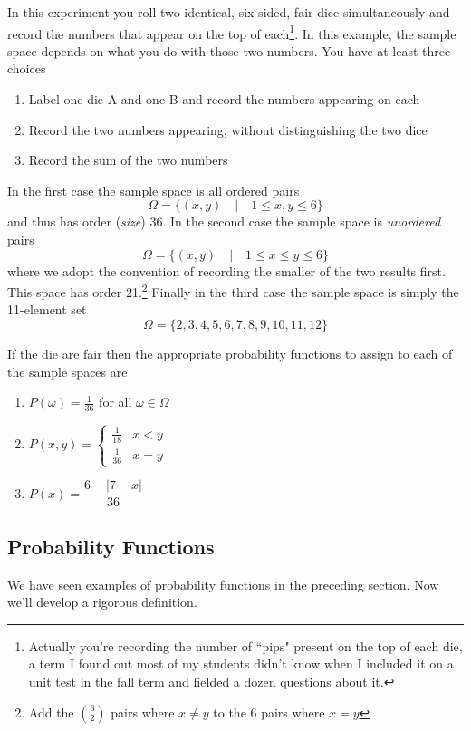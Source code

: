 \documentclass[../main.tex]{subfiles}
\begin{document}
\begin{example}
	In this experiment you roll two identical, six-sided, fair dice
	simultaneously and record the numbers that appear on the top of each\footnote{Actually you're recording the number of ``pips"
		present on the top of each die, a term I found out most
		of my students didn't know when I included it on
		a unit test in the fall term and fielded a dozen
		questions about it.}. In this example, the sample space
	depends on what you do with those two numbers. You have
	at least three choices
	\begin{enumerate}
		\item Label one die A and one B and record the numbers
		appearing on each
		\item Record the two numbers appearing, without distinguishing the two dice
		\item Record the sum of the two numbers
	\end{enumerate}

	In the first case the sample space is all ordered pairs
	$$\Omega = \{(x,y) \quad | \quad 1 \leq x,y \leq 6\}$$
	and thus has order (\textit{size}) 36. In the second case the
	sample space is \textit{unordered} pairs
	$$\Omega = \{(x,y) \quad | \quad 1 \leq x \leq y \leq 6\}$$
	where we adopt the convention of recording the smaller of the
	two results first. This space has order 21.\footnote{Add the
	${6 \choose 2}$ pairs where $x \neq y$ to the 6 pairs
	where $x=y$} 
	Finally in the third case the sample
	space is simply the 11-element set
	$$\Omega = \{2,3,4,5,6,7,8,9,10,11,12\}$$
	
	If the die are fair then the appropriate probability functions
	to assign to each of the sample spaces are
	\begin{enumerate}
		\item $P(\omega)=\frac{1}{36}$ for all $\omega \in \Omega$
		\item $P(x,y)=
		\begin{cases}
			\frac{1}{18} & x<y\\
			 \frac{1}{36} & x=y
		\end{cases}$
		\item $P(x) = \dfrac{6-|7-x|}{36}$
	\end{enumerate}
	\end{example}

\subsection{Probability Functions}
We have seen examples of probability functions in the preceding section. Now we'll develop a rigorous definition. 
\end{document}
